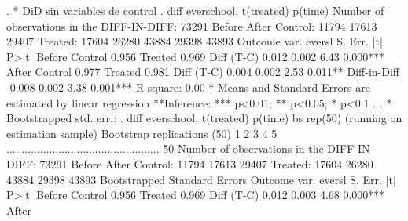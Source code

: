 . * DiD sin variables de control
. diff everschool, t(treated) p(time)
{\smallskip}
{}
Number of observations in the DIFF-IN-DIFF: 73291
            Before         After    
   Control: 11794          17613       29407
   Treated: 17604          26280       43884
            29398          43893
 Outcome var.   {\VBAR} evers{\tytilde}l {\VBAR} S. Err. {\VBAR}   |t|   {\VBAR}  P>|t|
Before          {\VBAR}         {\VBAR}         {\VBAR}         {\VBAR} 
   Control      {\VBAR} 0.956   {\VBAR}         {\VBAR}         {\VBAR} 
   Treated      {\VBAR} 0.969   {\VBAR}         {\VBAR}         {\VBAR} 
   Diff (T-C)   {\VBAR} 0.012   {\VBAR} 0.002   {\VBAR} 6.43    {\VBAR} 0.000***
After           {\VBAR}         {\VBAR}         {\VBAR}         {\VBAR} 
   Control      {\VBAR} 0.977   {\VBAR}         {\VBAR}         {\VBAR} 
   Treated      {\VBAR} 0.981   {\VBAR}         {\VBAR}         {\VBAR} 
   Diff (T-C)   {\VBAR} 0.004   {\VBAR} 0.002   {\VBAR} 2.53    {\VBAR} 0.011**
                {\VBAR}         {\VBAR}         {\VBAR}         {\VBAR} 
Diff-in-Diff    {\VBAR} -0.008  {\VBAR} 0.002   {\VBAR} 3.38    {\VBAR} 0.001***
R-square:    0.00
* Means and Standard Errors are estimated by linear regression
**Inference: *** p<0.01; ** p<0.05; * p<0.1
{\smallskip}
. 
. * Bootstrapped std. err.:
. diff everschool, t(treated) p(time) bs rep(50)
(running {} on estimation sample)
{\smallskip}
Bootstrap replications (50)
 1  2  3  4  5 
..................................................    50
{\smallskip}
{}
Number of observations in the DIFF-IN-DIFF: 73291
            Before         After    
   Control: 11794          17613       29407
   Treated: 17604          26280       43884
            29398          43893
Bootstrapped Standard Errors
{\smallskip}
 Outcome var.   {\VBAR} evers{\tytilde}l {\VBAR} S. Err. {\VBAR}   |t|   {\VBAR}  P>|t|
Before          {\VBAR}         {\VBAR}         {\VBAR}         {\VBAR} 
   Control      {\VBAR} 0.956   {\VBAR}         {\VBAR}         {\VBAR} 
   Treated      {\VBAR} 0.969   {\VBAR}         {\VBAR}         {\VBAR} 
   Diff (T-C)   {\VBAR} 0.012   {\VBAR} 0.003   {\VBAR} 4.68    {\VBAR} 0.000***
After           {\VBAR}         {\VBAR}         {\VBAR}         {\VBAR} 
